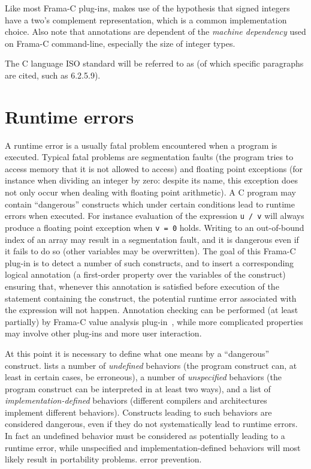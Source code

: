Like most Frama-C plug-ins, \rte{} makes use of the hypothesis that signed
integers have a two's complement representation, which is a common
implementation choice.  Also note that annotations are dependent of the {\it
  machine dependency} used on Frama-C command-line, especially the size of
integer types.

The C language ISO standard \cite{standardc99} will be referred to as \cnn{}
(of which specific paragraphs are cited, such as \mbox{6.2.5.9}).


\section{Runtime errors}

A runtime error is a usually fatal problem encountered when a program is
executed.  Typical fatal problems are segmentation faults (the program tries to
access memory that it is not allowed to access) and floating point exceptions
(for instance when dividing an integer by zero: despite its name, this exception
does not only occur when dealing with floating point arithmetic).  A C program
may contain ``dangerous'' constructs which under certain conditions lead to
runtime errors when executed.  For instance evaluation of the expression
\lstinline|u / v| will always produce a floating point exception when
\lstinline|v = 0| holds.  Writing to an out-of-bound index of an array may
result in a segmentation fault, and it is dangerous even if it fails to do so
(other variables may be overwritten).  The goal of this Frama-C plug-in is to
detect a number of such constructs, and to insert a corresponding logical
annotation (a first-order property over the variables of the construct) ensuring
that, whenever this annotation is satisfied before execution of the statement
containing the construct, the potential runtime error associated with the
expression will not happen.  Annotation checking can be performed (at least
partially) by Frama-C value analysis plug-in~\cite{framacvalueanalysis}, while
more complicated properties may involve other plug-ins and more user
interaction.

At this point it is necessary to define what one means by a ``dangerous''
construct.  \cnn{} lists a number of {\it undefined} behaviors (the program
construct can, at least in certain cases, be erroneous), a number of {\it
  unspecified} behaviors (the program construct can be interpreted in at least
two ways), and a list of {\it implementation-defined} behaviors (different
compilers and architectures implement different behaviors).  Constructs leading
to such behaviors are considered dangerous, even if they do not systematically
lead to runtime errors.  In fact an undefined behavior must be considered as
potentially leading to a runtime error, while unspecified and
implementation-defined behaviors will most likely result in portability
problems. %
error prevention.

